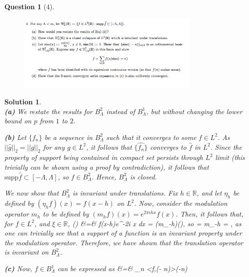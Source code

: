 \documentclass{article} %
\def\eQb#1\eQe{\begin{eqnarray*}#1\end{eqnarray*}}
\theoremstyle{quest}
\newtheorem*{question}{Question}
\newtheorem*{solution}{Solution}
\begin{document}
\begin{question}[4]
\hfill
\begin{figure}[h!]
  \centering
    \includegraphics[width=0.8\textwidth]{HA-5-4.png}
\end{figure}
\end{question}
\begin{solution} \hfill \\
\textbf{(a)} We restate the results for $B^2_{\Lambda}$ instead of $B^1_{\Lambda}$,
but without changing the lower bound on $p$ from $1$ to $2$. 

\bigskip

\textbf{(b)} Let $\{f_n\}$ be a sequence in $B_{\Lambda}^2$ such that it converges to
some $f \in L^2$. As $||\hat{g}||_2 = ||g||_2$ for any $g \in L^2$, it follows that
$\{\hat{f_n}\}$ converges to $\hat{f}$ in $L^2$. Since the property of support being contained
in compact set
persists through $L^2$ limit (this trivially can be shown using a proof by contradiction), 
it follows that $\text{supp}\hat{f} \subset [-\Lambda,\Lambda]$,
so $f \in B_{\Lambda}^2$. Hence, $B_{\Lambda}^2$ is closed. 

\smallskip

We now show that $B_{\Lambda}^2$ is invariant under translations. Fix $h \in \mathbb{R}$, and
let $\eta_{h}$ be defined by $(\eta_{h}f)(x) = f(x-h)$ on $L^2$. Now, consider the modulation
operator $m_{h}$ to be defined by $(m_{h}f)(x) = e^{2\pi ih x}f(x)$. Then, it follows 
that, for $f \in L^2$, and $\xi \in \mathbb{R}$, 
\eQb
\widehat{\eta_{h}f}(\xi) &=& \int f(x-h)e^{-2\pi i \xi x} dx = (m_{-h})(\xi),
\eQe
so 
\eQb
\text{supp}\> \>  = \> \> {m_{-h}} = 
\>\> , 
\eQe
as one can trivially see that a support of a function is an invariant property under 
the modulation operator.
Therefore, we have shown that the translation operator is invariant on $B_{\Lambda}^2$.


\bigskip 

\textbf{(c)} 
Now, $f \in B_{\Lambda}^{1}$ can be expressed as
\eQb
f &=& \sum_{n \in {}} <f,(\cdot - n)>(\cdot -n)
\eQe    


\end{solution}
\end{document}
